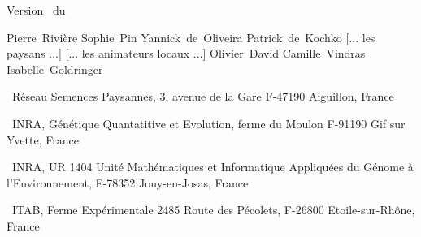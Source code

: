 


\graphicspath{{/home/pierre/Dropbox/PPB_formations_FR/figures/}} %

%
%
%
%
%
%
%
%
%



\pagestyle{empty}

\begin{center}


\vfill

\large
Version \versionCF~du \dateversionCF

\vfill

\normalsize

Pierre~Rivière \hspace{.5cm}
Sophie~Pin \hspace{.5cm}
Yannick~de~Oliveira \hspace{.5cm}
Patrick~de~Kochko \hspace{.5cm}
[... les paysans ...] \hspace{.5cm}
[... les animateurs locaux ...] \hspace{.5cm}
Olivier~David \hspace{.5cm}
Camille~Vindras \hspace{.5cm}
Isabelle~Goldringer \\
\end{center}

\small
\noindent{}~Réseau Semences Paysannes, 3, avenue de la Gare F-47190 Aiguillon, France 

\noindent{}~INRA, Génétique Quantatitive et Evolution, ferme du Moulon F-91190 Gif sur Yvette, France

\noindent{}~INRA, UR 1404 Unité Mathématiques et Informatique Appliquées du Génome à l'Environnement, F-78352 Jouy-en-Josas, France

\noindent{}~ITAB, Ferme Expérimentale 2485 Route des Pécolets, F-26800 Etoile-sur-Rhône, France

